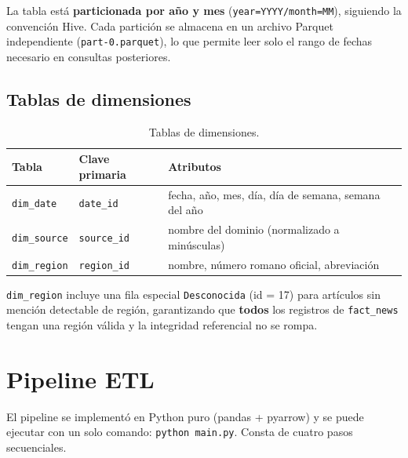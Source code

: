 \documentclass[11pt, letterpaper]{article}
\begin{document}
La tabla está \textbf{particionada por año y mes} (\texttt{year=YYYY/month=MM}),
siguiendo la convención Hive. Cada partición se almacena en un archivo Parquet
independiente (\texttt{part-0.parquet}), lo que permite leer solo el rango de
fechas necesario en consultas posteriores.

\subsection{Tablas de dimensiones}

\begin{table}[H]
\centering
\begin{tabular}{lll}
\toprule
\textbf{Tabla} & \textbf{Clave primaria} & \textbf{Atributos} \\
\midrule
\texttt{dim\_date}   & \texttt{date\_id}   & fecha, año, mes, día, día de semana, semana del año \\
\texttt{dim\_source} & \texttt{source\_id} & nombre del dominio (normalizado a minúsculas) \\
\texttt{dim\_region} & \texttt{region\_id} & nombre, número romano oficial, abreviación \\
\bottomrule
\end{tabular}
\caption{Tablas de dimensiones.}
\end{table}

\texttt{dim\_region} incluye una fila especial \texttt{Desconocida} (id = 17)
para artículos sin mención detectable de región, garantizando que
\textbf{todos} los registros de \texttt{fact\_news} tengan una región válida
y la integridad referencial no se rompa.

\section{Pipeline ETL}

El pipeline se implementó en Python puro (pandas + pyarrow) y se puede
ejecutar con un solo comando: \texttt{python main.py}. Consta de cuatro
pasos secuenciales.
\end{document}

